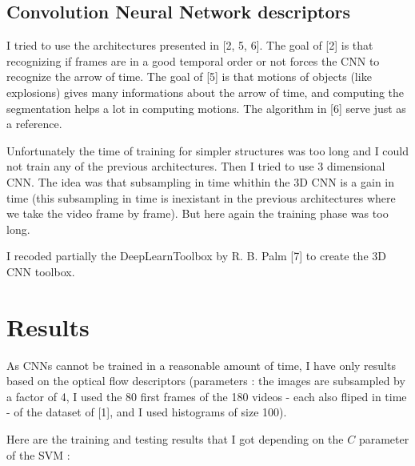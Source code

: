 \documentclass[10pt,a4paper]{report}
\begin{document}
		\subsection*{Convolution Neural Network descriptors}
		
		I tried to use the architectures presented in [2, 5, 6]. The goal of [2] is that recognizing if frames are in a good temporal order or not forces the CNN to recognize the arrow of time. The goal of [5] is that motions of objects (like explosions) gives many informations about the arrow of time, and computing the segmentation helps a lot in computing motions. The algorithm in [6] serve just as a reference.
		
		Unfortunately the time of training for simpler structures was too long and I could not train any of the previous architectures. Then I tried to use 3 dimensional CNN. The idea was that subsampling in time whithin the 3D CNN is a gain in time (this subsampling in time is inexistant in the previous architectures where we take the video frame by frame). But here again the training phase was too long.
		
		I recoded partially the DeepLearnToolbox by R. B. Palm [7] to create the 3D CNN toolbox.
		
		\section*{Results}
		
			As CNNs cannot be trained in a reasonable amount of time, I have only results based on the optical flow descriptors (parameters : the images are subsampled by a factor of 4, I used the 80 first frames of the 180 videos - each also fliped in time - of the dataset of [1], and I used histograms of size 100).
			
			Here are the training and testing results that I got depending on the $C$ parameter of the SVM :
		
		\begin{figure}[h]
			
			\label{fig:f}
		\end{figure}
		
\end{document}
